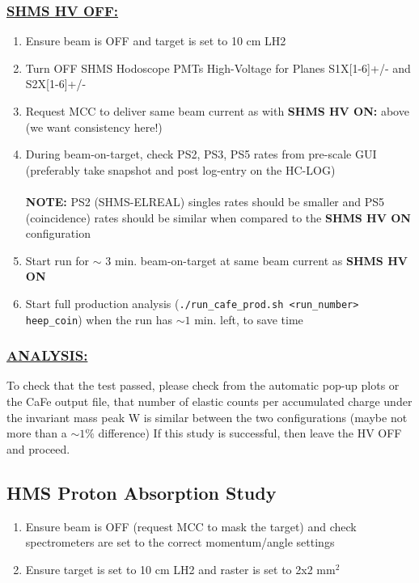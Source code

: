 \documentclass{article}
\begin{document}
\subsubsection*{\underline{SHMS HV OFF:}}
 \begin{enumerate}
    \item Ensure beam is OFF and target is set to 10 cm LH2
    \item Turn OFF SHMS Hodoscope PMTs High-Voltage for Planes S1X[1-6]+/- and S2X[1-6]+/- 
    \item Request MCC to deliver same beam current as with \textbf{SHMS HV ON:} above (we want consistency here!)
    \item During beam-on-target, check PS2, PS3, PS5 rates from pre-scale GUI (preferably take snapshot and post log-entry on the HC-LOG) \\\\ \textbf{NOTE:} PS2 (SHMS-ELREAL) singles rates should be smaller and PS5 (coincidence) rates should be similar when compared to the \textbf{SHMS HV ON} configuration 
    \item Start run for $\sim$ 3  min. beam-on-target at same beam current as \textbf{SHMS HV ON}
    \item Start full production analysis (\texttt{./run\_cafe\_prod.sh <run\_number> heep\_coin}) when the run has $\sim 1$ min. left, to save time
    \end{enumerate}
\subsubsection*{\underline{ANALYSIS:}}
 \begin{enumerate}
 To check that the test passed, please check from the automatic pop-up plots or the CaFe output file, that number of elastic counts per accumulated charge under the invariant mass peak W is similar between the two configurations (maybe not more than a $\sim 1\%$ difference)
 If this study is successful, then leave the HV OFF and proceed.
 \end{enumerate}
\subsection{HMS Proton Absorption Study}
\begin{enumerate}
    \item Ensure beam is OFF (request MCC to mask the target) and check spectrometers are
    set to the correct momentum/angle settings
    \item Ensure target is set to 10 cm LH2 and raster is set to 2x2 mm$^{2}$
\end{enumerate}
\end{document}
